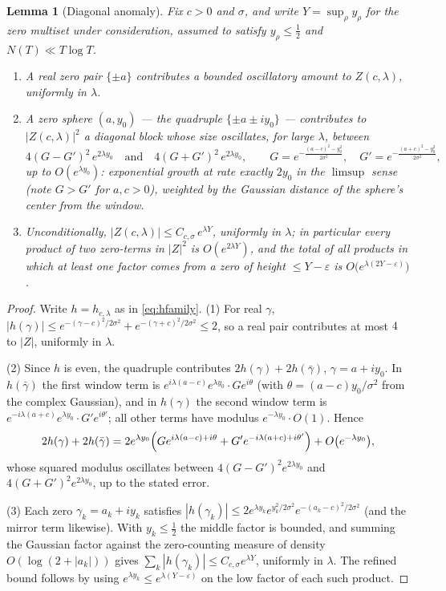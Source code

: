 \documentclass[11pt]{amsart}
\theoremstyle{plain}
\newtheorem{lemma}[theorem]{Lemma}
\theoremstyle{definition}
\theoremstyle{remark}
\begin{document}
\begin{lemma}[Diagonal anomaly]\label{lem:anomaly}
Fix $c>0$ and $\sigma$, and write $Y=\sup_\rho y_\rho$ for the zero multiset under
consideration, assumed to satisfy $y_\rho\le\tfrac12$ and $N(T)\ll T\log T$.
\begin{enumerate}
\item A real zero pair $\{\pm a\}$ contributes a bounded oscillatory amount to $Z(c,\lambda)$,
uniformly in $\lambda$.
\item A zero sphere $(a,y_0)$ --- the quadruple $\{\pm a\pm iy_0\}$ --- contributes to
$|Z(c,\lambda)|^2$ a diagonal block whose size oscillates, for large $\lambda$, between
\[
4(G-G')^2\,e^{2\lambda y_0}\quad\text{and}\quad4(G+G')^2\,e^{2\lambda y_0},
\qquad
G=e^{-\frac{(a-c)^2-y_0^2}{2\sigma^2}},\quad G'=e^{-\frac{(a+c)^2-y_0^2}{2\sigma^2}},
\]
up to $O(e^{\lambda y_0})$: exponential growth at rate exactly $2y_0$ in the $\limsup$ sense
(note $G>G'$ for $a,c>0$), weighted by the Gaussian distance of the sphere's center from the
window.
\item Unconditionally, $|Z(c,\lambda)|\le C_{c,\sigma}\,e^{\lambda Y}$, uniformly in $\lambda$;
in particular every product of two zero-terms in $|Z|^2$ is $O(e^{2\lambda Y})$, and the total
of all products in which at least one factor comes from a zero of height $\le Y-\varepsilon$ is
$O\bigl(e^{\lambda(2Y-\varepsilon)}\bigr)$.
\end{enumerate}
\end{lemma}

\begin{proof}
Write $h=h_{c,\lambda}$ as in \eqref{eq:hfamily}. (1) For real $\gamma$,
$|h(\gamma)|\le e^{-(\gamma-c)^2/2\sigma^2}+e^{-(\gamma+c)^2/2\sigma^2}\le2$, so a real pair
contributes at most $4$ to $|Z|$, uniformly in $\lambda$.

(2) Since $h$ is even, the quadruple contributes $2h(\gamma)+2h(\bar\gamma)$, $\gamma=a+iy_0$.
In $h(\bar\gamma)$ the first window term is
$e^{i\lambda(a-c)}e^{\lambda y_0}\cdot Ge^{i\theta}$ (with $\theta=(a-c)y_0/\sigma^2$ from the
complex Gaussian), and in $h(\gamma)$ the second window term is
$e^{-i\lambda(a+c)}e^{\lambda y_0}\cdot G'e^{i\theta'}$; all other terms have modulus
$e^{-\lambda y_0}\cdot O(1)$. Hence
\[
2h(\gamma)+2h(\bar\gamma)
=2e^{\lambda y_0}\Bigl(Ge^{i\lambda(a-c)+i\theta}+G'e^{-i\lambda(a+c)+i\theta'}\Bigr)
+O\bigl(e^{-\lambda y_0}\bigr),
\]
whose squared modulus oscillates between $4(G-G')^2e^{2\lambda y_0}$ and
$4(G+G')^2e^{2\lambda y_0}$, up to the stated error.

(3) Each zero $\gamma_k=a_k+iy_k$ satisfies $|h(\gamma_k)|\le
2e^{\lambda y_k}e^{y_k^2/2\sigma^2}e^{-(a_k-c)^2/2\sigma^2}$
(and the mirror term likewise). With $y_k\le\tfrac12$ the middle factor is bounded, and summing
the Gaussian factor against the zero-counting measure of density $O(\log(2+|a_k|))$ gives
$\sum_k|h(\gamma_k)|\le C_{c,\sigma}e^{\lambda Y}$, uniformly in $\lambda$. The refined bound
follows by using $e^{\lambda y_k}\le e^{\lambda(Y-\varepsilon)}$ on the low factor of each such
product.
\end{proof}
\end{document}
